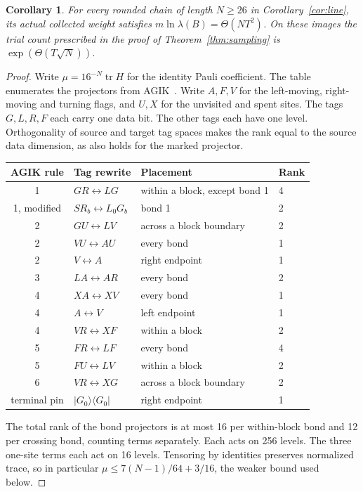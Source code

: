 \documentclass[11pt]{article}
\newtheorem{corollary}[theorem]{Corollary}
\newcommand{\ket}[1]{\lvert #1\rangle}
\newcommand{\bra}[1]{\langle #1\rvert}
\begin{document}
\begin{corollary}\label{cor:chaincost}
For every rounded chain of length \(N\ge26\) in Corollary~\ref{cor:line}, its actual collected weight satisfies \(m\ln\lambda(B)=\Theta(NT^2)\). On these images the trial count prescribed in the proof of Theorem~\ref{thm:sampling} is \(\exp(\Theta(T\sqrt N))\).
\end{corollary}
\begin{proof}
Write \(\mu=16^{-N}\operatorname{tr}H\) for the identity Pauli coefficient. The table enumerates the projectors from AGIK~\cite[Sec.~2, rules 1--6 immediately preceding Fig.~1]{agik}. Write \(A,F,V\) for the left-moving, right-moving and turning flags, and \(U,X\) for the unvisited and spent sites. The tags \(G,L,R,F\) each carry one data bit. The other tags each have one level. Orthogonality of source and target tag spaces makes the rank equal to the source data dimension, as also holds for the marked projector.
\begin{center}
\small
\begin{tabular}{clll}
AGIK rule & Tag rewrite & Placement & Rank\\ \hline
1 & \(GR\leftrightarrow LG\) & within a block, except bond 1 & 4\\
1, modified & \(SR_b\leftrightarrow L_0G_b\) & bond 1 & 2\\
2 & \(GU\leftrightarrow LV\) & across a block boundary & 2\\
2 & \(VU\leftrightarrow AU\) & every bond & 1\\
2 & \(V\leftrightarrow A\) & right endpoint & 1\\
3 & \(LA\leftrightarrow AR\) & every bond & 2\\
4 & \(XA\leftrightarrow XV\) & every bond & 1\\
4 & \(A\leftrightarrow V\) & left endpoint & 1\\
4 & \(VR\leftrightarrow XF\) & within a block & 2\\
5 & \(FR\leftrightarrow LF\) & every bond & 4\\
5 & \(FU\leftrightarrow LV\) & within a block & 2\\
6 & \(VR\leftrightarrow XG\) & across a block boundary & 2\\
terminal pin & \(\ket{G_0}\bra{G_0}\) & right endpoint & 1
\end{tabular}
\end{center}
The total rank of the bond projectors is at most 16 per within-block bond and 12 per crossing bond, counting terms separately. Each acts on 256 levels. The three one-site terms each act on 16 levels. Tensoring by identities preserves normalized trace, so in particular \(\mu\le7(N-1)/64+3/16\), the weaker bound used below.


\end{proof}
\end{document}
